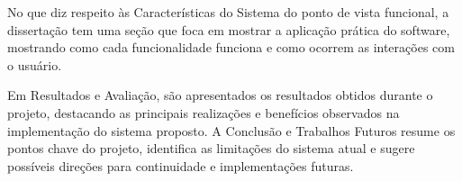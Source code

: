 No que diz respeito às Características do Sistema do ponto de vista funcional, a dissertação tem uma seção que foca em mostrar a aplicação prática do software, mostrando como cada funcionalidade funciona e como ocorrem as interações com o usuário.

Em Resultados e Avaliação, são apresentados os resultados obtidos durante o projeto, destacando as principais realizações e benefícios observados na implementação do sistema proposto. A Conclusão e Trabalhos Futuros resume os pontos chave do projeto, identifica as limitações do sistema atual e sugere possíveis direções para continuidade e implementações futuras.









